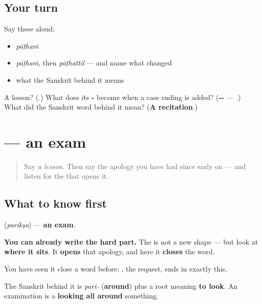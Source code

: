 \subsection*{Your turn}
Say these aloud:

\begin{itemize}
\raggedright
  \item \emph{pāṭhaṁ}
  \item \emph{pāṭhaṁ}, then \emph{pāṭhattil} — and name what changed
  \item what the Sanskrit behind it means
\end{itemize}

\begin{tcolorbox}[breakable,colback=teal!4,colframe=teal!35!black,title={Before you move on}]
A lesson? (\textbf{}.) What does its \textbf{-} become when a case ending is added? (\textbf{--} — \textbf{}.) What did the Sanskrit word behind it mean? (\textbf{A recitation}.)
\end{tcolorbox}
\section[\texorpdfstring{\ml{പരീക്ഷ} (parīkṣa)}{പരീക്ഷ (parīkṣa)}]{ — an exam}

\label{lesson:ML-C103-pareeksha}



\begin{quote}
Say \emph{a lesson}. Then say the apology you have had since early on — and listen for the \textbf{} that opens it.
\end{quote}

\subsection*{What to know first}
\textbf{} (\emph{parīkṣa}) — \textbf{an exam}.

\textbf{You can already write the hard part.} The \textbf{} is not a new shape — but look at \textbf{where it sits}. It \textbf{opens} that apology, and here it \textbf{closes} the word.

You have seen it close a word before: \textbf{}, the request, ends in exactly this.

The Sanskrit behind it is \emph{pari-} (\textbf{around}) plus a root meaning \textbf{to look}. An examination is a \textbf{looking all around} something.

